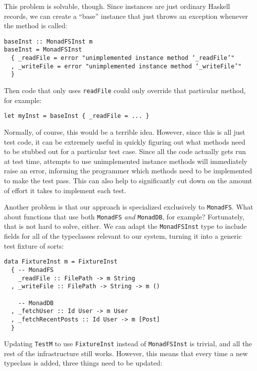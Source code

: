 This problem is solvable, though. Since instances are just ordinary
Haskell records, we can create a ``base'' instance that just throws an
exception whenever the method is called:

\begin{verbatim}
baseInst :: MonadFSInst m
baseInst = MonadFSInst
  { _readFile = error "unimplemented instance method ‘_readFile’"
  , _writeFile = error "unimplemented instance method ‘_writeFile’"
  }
\end{verbatim}
Then code that only uses \texttt{readFile} could only override that
particular method, for example:

\begin{verbatim}
let myInst = baseInst { _readFile = ... }
\end{verbatim}
Normally, of course, this would be a terrible idea. However, since this
is all just test code, it can be extremely useful in quickly figuring
out what methods need to be stubbed out for a particular test case.
Since all the code actually gets run at test time, attempts to use
unimplemented instance methods will immediately raise an error,
informing the programmer which methods need to be implemented to make
the test pass. This can also help to significantly cut down on the
amount of effort it takes to implement each test.

Another problem is that our approach is specialized exclusively to
\texttt{MonadFS}. What about functions that use both \texttt{MonadFS}
\emph{and} \texttt{MonadDB}, for example? Fortunately, that is not hard
to solve, either. We can adapt the \texttt{MonadFSInst} type to include
fields for all of the typeclasses relevant to our system, turning it
into a generic test fixture of sorts:

\begin{verbatim}
data FixtureInst m = FixtureInst
  { -- MonadFS
    _readFile :: FilePath -> m String
  , _writeFile :: FilePath -> String -> m ()

    -- MonadDB
  , _fetchUser :: Id User -> m User
  , _fetchRecentPosts :: Id User -> m [Post]
  }
\end{verbatim}
Updating \texttt{TestM} to use \texttt{FixtureInst} instead of
\texttt{MonadFSInst} is trivial, and all the rest of the infrastructure
still works. However, this means that every time a new typeclass is
added, three things need to be updated:

